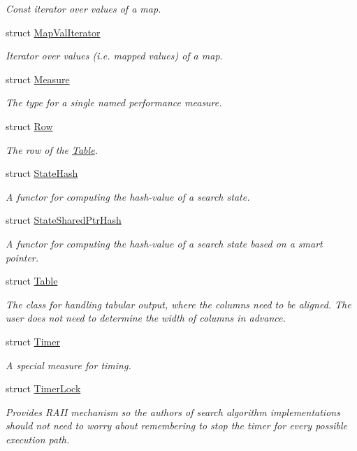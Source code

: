 \begin{DoxyCompactItemize}
\begin{DoxyCompactList}\small\item\em Const iterator over values of a map. \end{DoxyCompactList}\item 
struct \hyperlink{structslb_1_1core_1_1util_1_1MapValIterator}{Map\+Val\+Iterator}
\begin{DoxyCompactList}\small\item\em Iterator over values (i.\+e. mapped values) of a map. \end{DoxyCompactList}\item 
struct \hyperlink{structslb_1_1core_1_1util_1_1Measure}{Measure}
\begin{DoxyCompactList}\small\item\em The type for a single named performance measure. \end{DoxyCompactList}\item 
struct \hyperlink{structslb_1_1core_1_1util_1_1Row}{Row}
\begin{DoxyCompactList}\small\item\em The row of the \hyperlink{structslb_1_1core_1_1util_1_1Table}{Table}. \end{DoxyCompactList}\item 
struct \hyperlink{structslb_1_1core_1_1util_1_1StateHash}{State\+Hash}
\begin{DoxyCompactList}\small\item\em A functor for computing the hash-\/value of a search state. \end{DoxyCompactList}\item 
struct \hyperlink{structslb_1_1core_1_1util_1_1StateSharedPtrHash}{State\+Shared\+Ptr\+Hash}
\begin{DoxyCompactList}\small\item\em A functor for computing the hash-\/value of a search state based on a smart pointer. \end{DoxyCompactList}\item 
struct \hyperlink{structslb_1_1core_1_1util_1_1Table}{Table}
\begin{DoxyCompactList}\small\item\em The class for handling tabular output, where the columns need to be aligned. The user does not need to determine the width of columns in advance. \end{DoxyCompactList}\item 
struct \hyperlink{structslb_1_1core_1_1util_1_1Timer}{Timer}
\begin{DoxyCompactList}\small\item\em A special measure for timing. \end{DoxyCompactList}\item 
struct \hyperlink{structslb_1_1core_1_1util_1_1TimerLock}{Timer\+Lock}
\begin{DoxyCompactList}\small\item\em Provides R\+A\+II mechanism so the authors of search algorithm implementations should not need to worry about remembering to stop the timer for every possible execution path. \end{DoxyCompactList}\end{DoxyCompactItemize}
